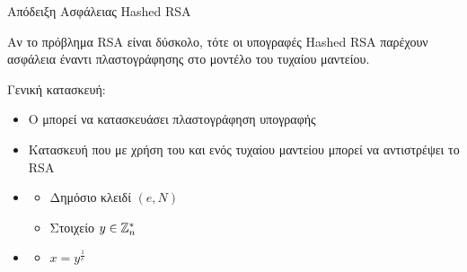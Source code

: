 \documentclass[handout]{beamer}
\begin{document}
\begin{frame}{Απόδειξη Ασφάλειας Hashed RSA}
\begin{theorem}
Αν το πρόβλημα RSA είναι δύσκολο, τότε οι υπογραφές Hashed RSA παρέχουν ασφάλεια έναντι πλαστογράφησης στο μοντέλο του τυχαίου μαντείου.
\end{theorem}
\pause
Γενική κατασκευή:
\begin{itemize}
\item Ο \adv μπορεί να κατασκευάσει πλαστογράφηση υπογραφής
\pause
\item Κατασκευή \advb που με χρήση του \adv και ενός τυχαίου μαντείου μπορεί να αντιστρέψει το RSA
\pause
\item {}
\begin{itemize}
\item Δημόσιο κλειδί $(e,N)$
\pause
\item Στοιχείο $y \in \mathbb{Z}^*_n$
\pause
\end{itemize}
\item {}
\begin{itemize}
\item $x=y^\frac{1}{e}$
\end{itemize}
\end{itemize}
\end{frame}
\end{document}
